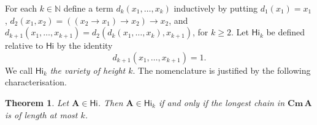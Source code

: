 \documentclass{amsart}
\newtheorem{theorem}{Theorem}[section]
\newcommand{\alg}[1]{\mathbf{#1}}
\newcommand{\var}[1]{\mathsf{#1}}
\newcommand{\Cm}[1]{\mathbf{Cm}\, #1}
\def\ra{\rightarrow}
\begin{document}
For each $k\in \mathbb{N}$ define a term $d_k(x_1,\dots,x_k)$ inductively by
putting
$d_1(x_1) = x_1$, $d_2(x_1,x_2) = ((x_2\ra x_1)\ra x_2)\ra x_2$,
and 
$d_{k+1}(x_1,\dots, x_{k+1}) = d_2(d_k(x_1,\dots,x_k), x_{k+1})$, for
$k\geq 2$. Let $\var{Hi}_k$ be defined relative to $\var{Hi}$
by the identity
\begin{equation}\label{eq:Hk}\tag{$H_k$}
d_{k+1}(x_1,\dots, x_{k+1}) = 1.
\end{equation}
We call $\var{Hi}_k$ \emph{the variety of height $k$}. The nomenclature is 
justified by the following characterisation. 

\begin{theorem}
Let $\alg{A}\in \var{Hi}$. Then  $\alg{A}\in \var{Hi}_k$ if and only if
the longest chain in $\Cm{\alg{A}}$ is of length at most $k$.  
\end{theorem}
\end{document}
